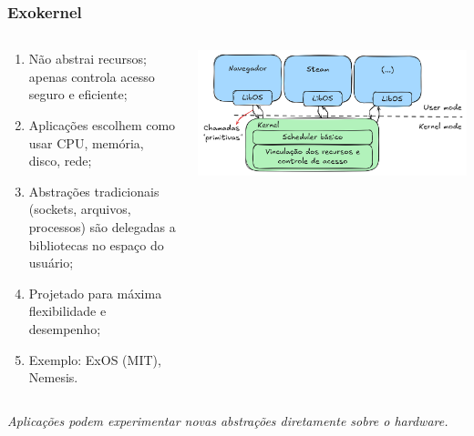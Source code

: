 \documentclass{beamer}
\begin{document}
\begin{frame}[fragile]
    \frametitle{Exokernel}

    \begin{columns}
        \begin{column}{0.4\textwidth}
            \begin{enumerate}\footnotesize
                \item Não abstrai recursos; apenas controla acesso seguro e eficiente;
                \item Aplicações escolhem como usar CPU, memória, disco, rede;
                \item Abstrações tradicionais (sockets, arquivos, processos) são delegadas a bibliotecas no espaço do usuário;
                \item Projetado para máxima flexibilidade e desempenho;
                \item Exemplo: ExOS (MIT), Nemesis.
            \end{enumerate}
        \end{column}
        \begin{column}{0.6\textwidth}
            \begin{center}
                \includegraphics[width=\textwidth]{../figures/exokernel.png}
            \end{center}
        \end{column}
    \end{columns}
    \vfill
    \begin{center}
        \textit{Aplicações podem experimentar novas abstrações diretamente sobre o hardware.}
    \end{center}
\end{frame}
\end{document}
